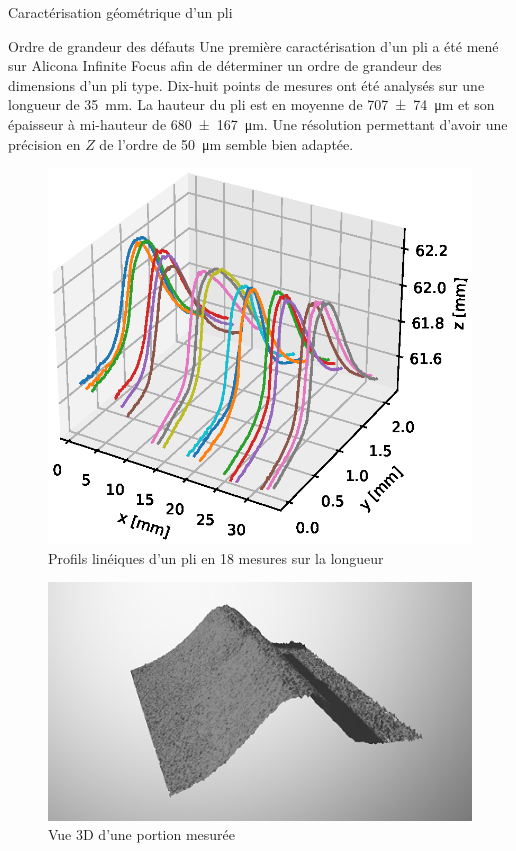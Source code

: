 \documentclass[8pt]{beamer}
\begin{document}
	\begin{frame}{Caractérisation géométrique d'un pli}
		\begin{block}{Ordre de grandeur des défauts}
			Une première caractérisation d'un pli a été mené sur Alicona Infinite Focus afin de déterminer un ordre de grandeur des dimensions d'un pli type. Dix-huit points de mesures ont été analysés sur une longueur de \SI{35}{\milli\meter}. La hauteur du pli est en moyenne de \SI{707(74)}{\micro\meter} et son épaisseur à mi-hauteur de \SI{680(167)}{\micro\meter}. Une résolution permettant d'avoir une précision en $Z$ de l'ordre de \SI{50}{\micro\meter} semble bien adaptée.
		\end{block}
		\begin{minipage}[c]{0.49\textwidth}
			\begin{figure}\centering
				\includegraphics[width=1.\textwidth]{profiles.eps}
				\caption{Profils linéiques d'un pli en 18 mesures sur la longueur}
			\end{figure}
		\end{minipage}\hfill
		\begin{minipage}[c]{.49\textwidth}
			\begin{figure}\centering
				\includegraphics[width=1.\textwidth]{pli_01_3d_small.png}
				\caption{Vue 3D d'une portion mesurée}
			\end{figure}
		\end{minipage}
	\end{frame}
\end{document}

